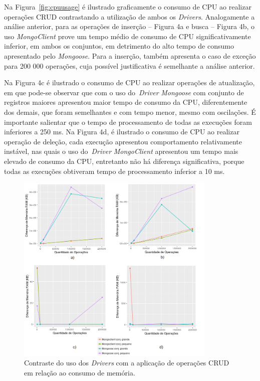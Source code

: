\documentclass[12pt]{article}
\begin{document}
Na Figura~\ref{fig:cpuusage} é ilustrado graficamente o consumo de CPU ao realizar operações CRUD contrastando a utilização de ambos os \emph{Drivers}.
Analogamente a análise anterior, para as operações de inserção -- Figura 4a e busca -- Figura 4b, o uso \emph{MongoClient} prove um tempo médio de consumo de CPU significativamente inferior, em ambos os conjuntos, em detrimento do alto tempo de consumo apresentado pelo \emph{Mongoose}. Para a inserção, também apresenta o caso de exceção para 200 000 operações, cuja possível justificativa é semelhante a análise anterior.

Na Figura 4c é ilustrado o consumo de CPU ao realizar operações de atualização, em que pode-se observar que com o uso do~\emph{Driver} \emph{Mongoose} com conjunto de registros maiores apresentou maior tempo de consumo da CPU, diferentemente dos demais, que foram semelhantes e com tempo menor, mesmo com oscilações. 
É importante salientar que o tempo de processamento de todas as execuções foram inferiores a 250 ms.
Na Figura 4d, é ilustrado o consumo de CPU ao realizar operação de deleção, cada execução apresentou comportamento relativamente instável, nas quais o uso do~\emph{Driver} \emph{MongoClient} apresentou um tempo mais elevado de consumo da CPU, entretanto não há diferença significativa, porque todas as execuções obtiveram tempo de processamento inferior a 10 ms.

\begin{figure}[!ht]
    \centering
    \includegraphics[width=0.85\textwidth]{images/memory}
	 \caption{Contraste do uso dos \emph{Drivers} com a aplicação de operações CRUD em relação ao consumo de memória.}
    \label{fig:memory}
\end{figure}
\end{document}
